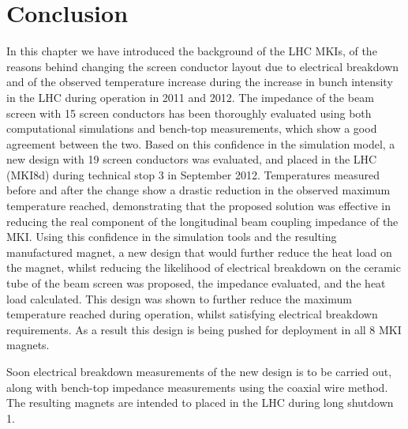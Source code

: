 \section{Conclusion}

In this chapter we have introduced the background of the LHC MKIs, of the reasons behind changing the screen conductor layout due to electrical breakdown and of the observed temperature increase during the increase in bunch intensity in the LHC during operation in 2011 and 2012. The impedance of the beam screen with 15 screen conductors has been thoroughly evaluated using both computational simulations and bench-top measurements, which show a good agreement between the two. Based on this confidence in the simulation model, a new design with 19 screen conductors was evaluated, and placed in the LHC (MKI8d) during technical stop 3 in September 2012. Temperatures measured before and after the change show a drastic reduction in the observed maximum temperature reached, demonstrating that the proposed solution was effective in reducing the real component of the longitudinal beam coupling impedance of the MKI. Using this confidence in the simulation tools and the resulting manufactured magnet, a new design that would further reduce the heat load on the magnet, whilst reducing the likelihood of electrical breakdown on the ceramic tube of the beam screen was proposed, the impedance evaluated, and the heat load calculated. This design was shown to further reduce the maximum temperature reached during operation, whilst satisfying electrical breakdown requirements. As a result this design is being pushed for deployment in all 8 MKI magnets. 

Soon electrical breakdown measurements of the new design is to be carried out, along with bench-top impedance measurements using the coaxial wire method. The resulting magnets are intended to placed in the LHC during long shutdown 1.